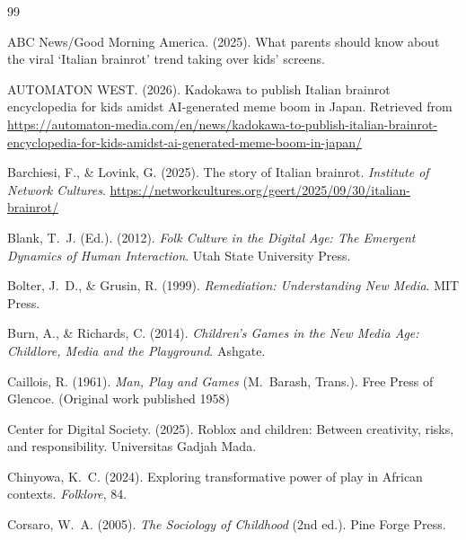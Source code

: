 \documentclass[12pt]{article}
\begin{document}
\begin{thebibliography}{99}

ABC News/Good Morning America. (2025).
\newblock What parents should know about the viral `Italian brainrot' trend taking over kids' screens.

AUTOMATON WEST. (2026).
\newblock Kadokawa to publish Italian brainrot encyclopedia for kids amidst AI-generated meme boom in Japan.
\newblock Retrieved from \url{https://automaton-media.com/en/news/kadokawa-to-publish-italian-brainrot-encyclopedia-for-kids-amidst-ai-generated-meme-boom-in-japan/}

Barchiesi, F., \& Lovink, G. (2025).
\newblock The story of Italian brainrot.
\newblock \emph{Institute of Network Cultures}.
\newblock \url{https://networkcultures.org/geert/2025/09/30/italian-brainrot/}

Blank, T.~J. (Ed.). (2012).
\newblock \emph{Folk Culture in the Digital Age: The Emergent Dynamics of Human Interaction}.
\newblock Utah State University Press.

Bolter, J.~D., \& Grusin, R. (1999).
\newblock \emph{Remediation: Understanding New Media}.
\newblock MIT Press.

Burn, A., \& Richards, C. (2014).
\newblock \emph{Children's Games in the New Media Age: Childlore, Media and the Playground}.
\newblock Ashgate.

Caillois, R. (1961).
\newblock \emph{Man, Play and Games} (M.~Barash, Trans.).
\newblock Free Press of Glencoe. (Original work published 1958)

Center for Digital Society. (2025).
\newblock Roblox and children: Between creativity, risks, and responsibility.
\newblock Universitas Gadjah Mada.

Chinyowa, K.~C. (2024).
\newblock Exploring transformative power of play in African contexts.
\newblock \emph{Folklore}, 84.

Corsaro, W.~A. (2005).
\newblock \emph{The Sociology of Childhood} (2nd ed.).
\newblock Pine Forge Press.


\end{thebibliography}
\end{document}
